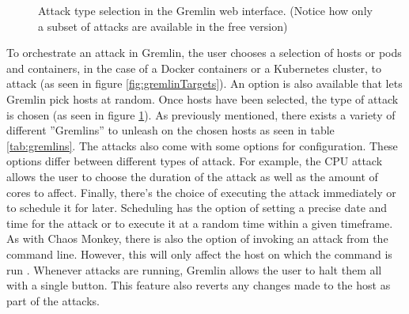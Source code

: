 \documentclass{article}
\begin{document}
\begin{figure}[h!]
    \caption{Attack type selection in the Gremlin web interface. (Notice how only a subset of attacks are available in the free version)}
    \centering
    \label{fig:gremlinAttacks}
\end{figure}

To orchestrate an attack in Gremlin, the user chooses a selection of hosts or pods and containers, in the case of a Docker containers or a Kubernetes cluster, to attack (as seen in figure \ref{fig:gremlinTargets}). An option is also available that lets Gremlin pick hosts at random. Once hosts have been selected, the type of attack is chosen (as seen in figure \ref{fig:gremlinAttacks}). As previously mentioned, there exists a variety of different ''Gremlins'' to unleash on the chosen hosts as seen in table \ref{tab:gremlins}. The attacks also come with some options for configuration. These options differ between different types of attack. For example, the CPU attack allows the user to choose the duration of the attack as well as the amount of cores to affect. Finally, there's the choice of executing the attack immediately or to schedule it for later. Scheduling has the option of setting a precise date and time for the attack or to execute it at a random time within a given timeframe. As with Chaos Monkey, there is also the option of invoking an attack from the command line. However, this will only affect the host on which the command is run \cite{gremlinManual}. Whenever attacks are running, Gremlin allows the user to halt them all with a single button. This feature also reverts any changes made to the host as part of the attacks.
\end{document}
